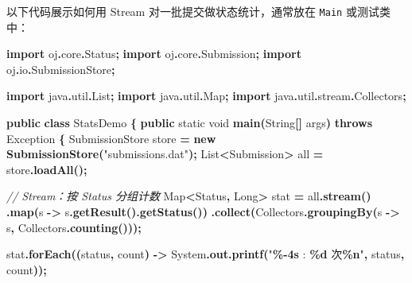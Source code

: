 \documentclass[
  11pt,
]{ctexart}
\newenvironment{Shaded}{\begin{snugshade}}{\end{snugshade}}
\newcommand{\BuiltInTok}[1]{#1}
\newcommand{\CommentTok}[1]{\textcolor[rgb]{0.56,0.35,0.01}{\textit{#1}}}
\newcommand{\DataTypeTok}[1]{\textcolor[rgb]{0.13,0.29,0.53}{#1}}
\newcommand{\FunctionTok}[1]{\textcolor[rgb]{0.13,0.29,0.53}{\textbf{#1}}}
\newcommand{\ImportTok}[1]{#1}
\newcommand{\KeywordTok}[1]{\textcolor[rgb]{0.13,0.29,0.53}{\textbf{#1}}}
\newcommand{\NormalTok}[1]{#1}
\newcommand{\OperatorTok}[1]{\textcolor[rgb]{0.81,0.36,0.00}{\textbf{#1}}}
\newcommand{\SpecialCharTok}[1]{\textcolor[rgb]{0.81,0.36,0.00}{\textbf{#1}}}
\newcommand{\StringTok}[1]{\textcolor[rgb]{0.31,0.60,0.02}{#1}}
\begin{document}
以下代码展示如何用 Stream 对一批提交做状态统计，通常放在 \texttt{Main}
或测试类中：

\begin{Shaded}
\begin{Highlighting}[]
\KeywordTok{import} \ImportTok{oj}\OperatorTok{.}\ImportTok{core}\OperatorTok{.}\ImportTok{Status}\OperatorTok{;}
\KeywordTok{import} \ImportTok{oj}\OperatorTok{.}\ImportTok{core}\OperatorTok{.}\ImportTok{Submission}\OperatorTok{;}
\KeywordTok{import} \ImportTok{oj}\OperatorTok{.}\ImportTok{io}\OperatorTok{.}\ImportTok{SubmissionStore}\OperatorTok{;}

\KeywordTok{import} \ImportTok{java}\OperatorTok{.}\ImportTok{util}\OperatorTok{.}\ImportTok{List}\OperatorTok{;}
\KeywordTok{import} \ImportTok{java}\OperatorTok{.}\ImportTok{util}\OperatorTok{.}\ImportTok{Map}\OperatorTok{;}
\KeywordTok{import} \ImportTok{java}\OperatorTok{.}\ImportTok{util}\OperatorTok{.}\ImportTok{stream}\OperatorTok{.}\ImportTok{Collectors}\OperatorTok{;}

\KeywordTok{public} \KeywordTok{class}\NormalTok{ StatsDemo }\OperatorTok{\{}
    \KeywordTok{public} \DataTypeTok{static} \DataTypeTok{void} \FunctionTok{main}\OperatorTok{(}\BuiltInTok{String}\OperatorTok{[]}\NormalTok{ args}\OperatorTok{)} \KeywordTok{throws} \BuiltInTok{Exception} \OperatorTok{\{}
\NormalTok{        SubmissionStore store }\OperatorTok{=} \KeywordTok{new} \FunctionTok{SubmissionStore}\OperatorTok{(}\StringTok{"submissions.dat"}\OperatorTok{);}
        \BuiltInTok{List}\OperatorTok{\textless{}}\NormalTok{Submission}\OperatorTok{\textgreater{}}\NormalTok{ all }\OperatorTok{=}\NormalTok{ store}\OperatorTok{.}\FunctionTok{loadAll}\OperatorTok{();}

        \CommentTok{// Stream：按 Status 分组计数}
        \BuiltInTok{Map}\OperatorTok{\textless{}}\NormalTok{Status}\OperatorTok{,} \BuiltInTok{Long}\OperatorTok{\textgreater{}}\NormalTok{ stat }\OperatorTok{=}\NormalTok{ all}\OperatorTok{.}\FunctionTok{stream}\OperatorTok{()}
            \OperatorTok{.}\FunctionTok{map}\OperatorTok{(}\NormalTok{s }\OperatorTok{{-}\textgreater{}}\NormalTok{ s}\OperatorTok{.}\FunctionTok{getResult}\OperatorTok{().}\FunctionTok{getStatus}\OperatorTok{())}
            \OperatorTok{.}\FunctionTok{collect}\OperatorTok{(}\NormalTok{Collectors}\OperatorTok{.}\FunctionTok{groupingBy}\OperatorTok{(}\NormalTok{s }\OperatorTok{{-}\textgreater{}}\NormalTok{ s}\OperatorTok{,}\NormalTok{ Collectors}\OperatorTok{.}\FunctionTok{counting}\OperatorTok{()));}

\NormalTok{        stat}\OperatorTok{.}\FunctionTok{forEach}\OperatorTok{((}\NormalTok{status}\OperatorTok{,}\NormalTok{ count}\OperatorTok{)} \OperatorTok{{-}\textgreater{}}
            \BuiltInTok{System}\OperatorTok{.}\FunctionTok{out}\OperatorTok{.}\FunctionTok{printf}\OperatorTok{(}\StringTok{"}\SpecialCharTok{\%{-}4s}\StringTok{ : }\SpecialCharTok{\%d}\StringTok{ 次}\SpecialCharTok{\%n}\StringTok{"}\OperatorTok{,}\NormalTok{ status}\OperatorTok{,}\NormalTok{ count}\OperatorTok{));}


\end{Highlighting}
\end{Shaded}
\end{document}
